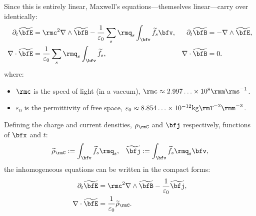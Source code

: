     Since this is entirely linear, Maxwell's equations---themselves linear---carry over identically:
    \begin{align*}
        \partial_{t}\widetilde{\bfE}  &=  \rmc^{2}\nabla\wedge\widetilde{\bfB} - \frac{1}{\varepsilon_{0}}\sum_{s}\rmq_{s}\int_{\bfv}\widetilde{f}_{s}\bfv,  &
        \partial_{t}\widetilde{\bfB}  &=  - \nabla\wedge\widetilde{\bfE},  \\
        \nabla\cdot\widetilde{\bfE}  &=  \frac{1}{\varepsilon_{0}}\sum_{s}\rmq_{s}\int_{\bfv}\widetilde{f}_{s},  &
        \nabla\cdot\widetilde{\bfB}  &=  0.
    \end{align*}
    where:
    \begin{itemize}
        \item  $\rmc$ is the speed of light (in a vaccum), $\rmc  \approx  2.997\ldots\times 10^{8}\rmm\rms^{- 1}$.
        \item  $\varepsilon_{0}$ is the permittivity of free space, $\varepsilon_{0}  \approx  8.854\ldots\times 10^{- 12}{\rm kg}\rmT^{- 2}\rmm^{- 3}$.
    \end{itemize}

    Defining the charge and current densities, $\rho_{\rmC}$ and $\bfj$ respectively, functions of $\bfx$ and $t$:
    \begin{align}
        \widetilde{\rho}_{\rmC}  :=  \int_{\bfv}\widetilde{f}_{s}\rmq_{s},  &&
               \widetilde{\bfj}  :=  \int_{\bfv}\widetilde{f}_{s}\rmq_{s}\bfv,
    \end{align}
    the inhomogeneous equations can be written in the compact forms:
    \begin{align*}
        \partial_{t}\widetilde{\bfE}  &=  \rmc^{2}\nabla\wedge\widetilde{\bfB} - \frac{1}{\varepsilon_{0}}\widetilde{\bfj},  \\
        \nabla\cdot\widetilde{\bfE}  &=  \frac{1}{\varepsilon_{0}}\widetilde{\rho}_{\rmC}.
    \end{align*}
    
